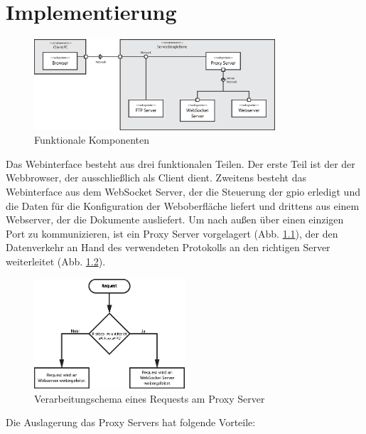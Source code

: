 \chapter{Implementierung}

\begin{figure}[ht]
\centering
\includegraphics[width = 0.8\textwidth]{documentation/images/components.eps}
\caption{Funktionale Komponenten}
\label{fig:functionalComponents}
\end{figure}

Das Webinterface besteht aus drei funktionalen Teilen. Der erste Teil ist der der Webbrowser, der ausschließlich als Client dient. Zweitens besteht das Webinterface aus dem WebSocket Server, der die Steuerung der \gls{gpio} erledigt und die Daten für die Konfiguration der Weboberfläche liefert und drittens aus einem Webserver, der die Dokumente ausliefert. Um nach außen über einen einzigen Port zu kommunizieren, ist ein Proxy Server vorgelagert (Abb. \ref{fig:functionalComponents}), der den Datenverkehr an Hand des verwendeten Protokolls an den richtigen Server weiterleitet (Abb. \ref{fig:requestForwarding}).

\begin{figure}[ht]
\centering
\includegraphics[width = 0.5\textwidth]{documentation/images/request.eps}
\caption{Verarbeitungschema eines Requests am Proxy Server}
\label{fig:requestForwarding}
\end{figure}

\noindent Die Auslagerung das Proxy Servers hat folgende Vorteile:

